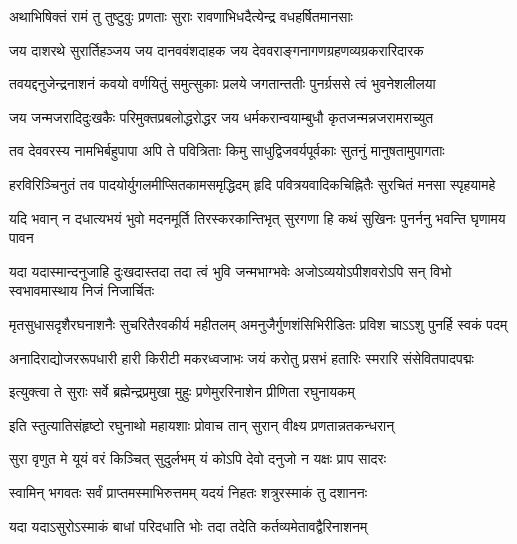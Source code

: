 


\twolineshloka
{अथाभिषिक्तं रामं तु तुष्टुवुः प्रणताः सुराः}
{रावणाभिधदैत्येन्द्र वधहर्षितमानसाः} %


\twolineshloka
{जय दाशरथे सुरार्तिहञ्जय जय दानववंशदाहक}
{जय देववराङ्गनागणग्रहणव्यग्रकरारिदारक} %

\twolineshloka
{तवयद्दनुजेन्द्रनाशनं कवयो वर्णयितुं समुत्सुकाः}
{प्रलये जगतान्ततीः पुनर्ग्रससे त्वं भुवनेशलीलया} %

\twolineshloka
{जय जन्मजरादिदुःखकैः परिमुक्तप्रबलोद्धरोद्धर}
{जय धर्मकरान्वयाम्बुधौ कृतजन्मन्नजरामराच्युत} %

\twolineshloka
{तव देववरस्य नामभिर्बहुपापा अपि ते पवित्रिताः}
{किमु साधुद्विजवर्यपूर्वकाः सुतनुं मानुषतामुपागताः} %

\twolineshloka
{हरविरिञ्चिनुतं तव पादयोर्युगलमीप्सितकामसमृद्धिदम्}
{हृदि पवित्रयवादिकचिह्नितैः सुरचितं मनसा स्पृहयामहे} %

\twolineshloka
{यदि भवान् न दधात्यभयं भुवो मदनमूर्ति तिरस्करकान्तिभृत्}
{सुरगणा हि कथं सुखिनः पुनर्ननु भवन्ति घृणामय पावन} %

\twolineshloka
{यदा यदास्मान्दनुजाहि दुःखदास्तदा तदा त्वं भुवि जन्मभाग्भवेः}
{अजोऽव्ययोऽपीशवरोऽपि सन् विभो स्वभावमास्थाय निजं निजार्चितः} %

\twolineshloka
{मृतसुधासदृशैरघनाशनैः सुचरितैरवकीर्य महीतलम्}
{अमनुजैर्गुणशंसिभिरीडितः प्रविश चाऽऽशु पुनर्हि स्वकं पदम्} %

\twolineshloka
{अनादिराद्योजररूपधारी हारी किरीटी मकरध्वजाभः}
{जयं करोतु प्रसभं हतारिः स्मरारि संसेवितपादपद्मः} %

\twolineshloka
{इत्युक्त्वा ते सुराः सर्वे ब्रह्मेन्द्रप्रमुखा मुहुः}
{प्रणेमुररिनाशेन प्रीणिता रघुनायकम्} %

\twolineshloka
{इति स्तुत्यातिसंहृष्टो रघुनाथो महायशाः}
{प्रोवाच तान् सुरान् वीक्ष्य प्रणतान्नतकन्धरान्} %


\twolineshloka
{सुरा वृणुत मे यूयं वरं किञ्चित् सुदुर्लभम्}
{यं कोऽपि देवो दनुजो न यक्षः प्राप सादरः} %


\twolineshloka
{स्वामिन् भगवतः सर्वं प्राप्तमस्माभिरुत्तमम्}
{यदयं निहतः शत्रुरस्माकं तु दशाननः} %

\twolineshloka
{यदा यदाऽसुरोऽस्माकं बाधां परिदधाति भोः}
{तदा तदेति कर्तव्यमेतावद्वैरिनाशनम्} %

